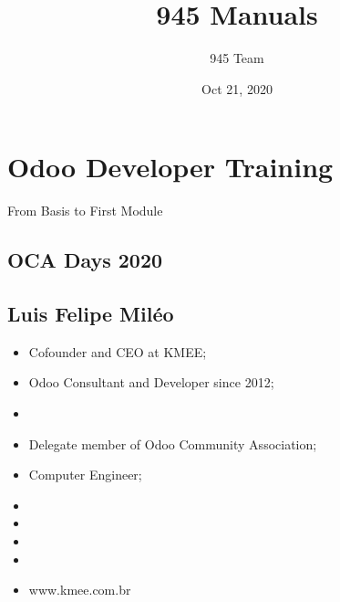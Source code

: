 \documentclass[letterpaper,10pt,english]{sphinxmanual}
\title{945 Manuals}
\date{Oct 21, 2020}
\author{945 Team}
\begin{document}
\pagestyle{empty}
\sphinxmaketitle
\pagestyle{plain}
\sphinxtableofcontents
\pagestyle{normal}
\label{\detokenize{index::doc}}



\chapter{Odoo Developer Training}
\label{\detokenize{technical:odoo-developer-training}}\label{\detokenize{technical::doc}}
From Basis to First Module


\section{OCA Days \sphinxhyphen{} 2020}
\label{\detokenize{technical:oca-days-2020}}


\section{Luis Felipe Miléo}
\label{\detokenize{technical:luis-felipe-mileo}}\begin{itemize}
\item {} 
Co\sphinxhyphen{}founder and CEO at KMEE;

\item {} 
Odoo Consultant and Developer since 2012;

\item {} 

\item {} 
Delegate member of Odoo Community Association;

\item {} 
Computer Engineer;

\item {} 

\item {} 

\item {} 

\item {} 

\item {} 
www.kmee.com.br

\end{itemize}
\end{document}

